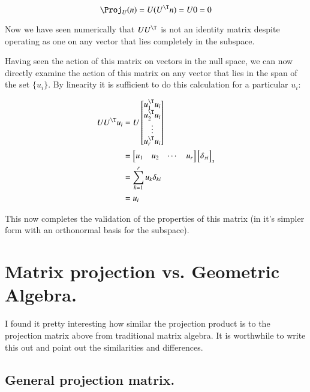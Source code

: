 \[
\Proj_U(n) = U (U^\T n) = U 0 = 0
\]

Now we have seen numerically that $U U^\T$ is not an identity matrix despite 
operating as one on any vector that lies completely in the subspace.

Having seen the action of this matrix on vectors in the null space, we can now
directly examine the action of this matrix on any vector that lies in the
span of the set $\{u_i\}$.  By linearity it is sufficient to do this calculation 
for a particular $u_i$:

\begin{align*}
U U^\T u_i
&=
U
\begin{bmatrix}
u_1^\T u_i \\
u_2^\T u_i \\
\vdots \\
u_r^\T u_i \\
\end{bmatrix}
\\
&=
\begin{bmatrix}
{u_1} & {u_2} & \cdots & {u_r} \\
\end{bmatrix}
{
\begin{bmatrix}
\delta_{si}
\end{bmatrix}
}_s \\
&= \sum_{k=1}^{r} u_k \delta_{ki} \\
&= u_i \\
\end{align*}

This now completes the validation of the properties of this matrix (in it's simpler form with an orthonormal basis for the subspace).

\section{Matrix projection vs. Geometric Algebra. }

I found it pretty interesting how similar the projection product is to the projection matrix above from traditional matrix algebra.  It is worthwhile
to write this out and point out the similarities and differences.

\subsection{General projection matrix. }

